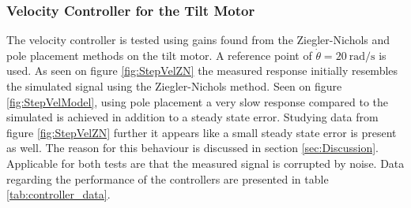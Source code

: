 \documentclass[../../main.tex]{subfiles}
\begin{document}
\subsubsection*{Velocity Controller for the Tilt Motor}
The velocity controller is tested using gains found from the Ziegler-Nichols and pole placement methods on the tilt motor. A reference point of $\Dot{\theta}=\SI{20}{\radian \per \second}$ is used. As seen on figure \ref{fig:StepVelZN} the measured response initially resembles the simulated signal using the Ziegler-Nichols method. Seen on figure \ref{fig:StepVelModel}, using pole placement a very slow response compared to the simulated is achieved in addition to a steady state error. Studying data from figure \ref{fig:StepVelZN} further it appears like a small steady state error is present as well. The reason for this behaviour is discussed in section \ref{sec:Discussion}. Applicable for both tests are that the measured signal is corrupted by noise. Data regarding the performance of the controllers are presented in table \ref{tab:controller_data}.
\end{document}
